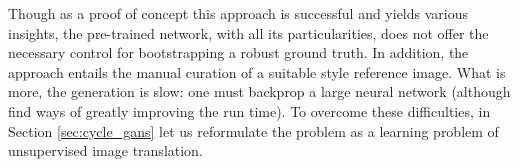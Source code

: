 Though as a proof of concept this approach is successful and yields various insights, the pre-trained network, with all its particularities, does not offer the necessary control for bootstrapping a robust ground truth. In addition, the approach entails the manual curation of a suitable style reference image. What is more, the generation is slow: one must backprop a large neural network (although \cite{johnson2016perceptual} find ways of greatly improving the run time). To overcome these difficulties, in Section \ref{sec:cycle_gans} let us reformulate the problem as a learning problem of unsupervised image translation.

%  

